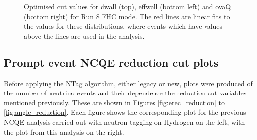 \begin{figure}
\begin{minipage}{.5\linewidth}
    \end{minipage}\par\medskip
    \centering
    
    \caption{Optimised cut values for dwall (top), effwall (bottom left) and ovaQ (bottom right) for Run 8 FHC mode. The red lines are linear fits to the values for these distributions, where events which have values above the lines are used in the analysis.}
    \label{fig:optimised_dwall_effwall_ovaq}
\end{figure}
    


\subsection{Prompt event NCQE reduction cut plots}

Before applying the NTag algorithm, either legacy or new, plots were produced of the number of neutrino events and their dependence the reduction cut variables mentioned previously. These are shown in Figures \ref{fig:erec_reduction} to \ref{fig:angle_reduction}. Each figure shows the corresponding plot for the previous NCQE analysis carried out with neutron tagging on Hydrogen on the left, with the plot from this analysis on the right. 


